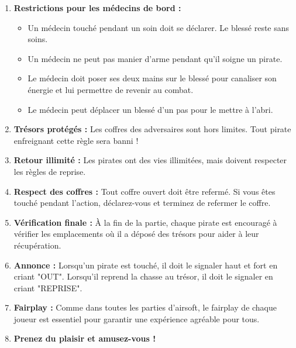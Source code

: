 \documentclass{pirategame}
\begin{document}
\begin{enumerate}[resume*=rules]
  \item \textbf{Restrictions pour les médecins de bord :}
    \begin{itemize}
      \item Un médecin touché pendant un soin doit se déclarer. Le blessé reste sans soins.
      \item Un médecin ne peut pas manier d'arme pendant qu'il soigne un pirate.
      \item Le médecin doit poser ses deux mains sur le blessé pour canaliser son énergie et lui permettre de revenir au combat.
      \item Le médecin peut déplacer un blessé d'un pas pour le mettre à l’abri.
    \end{itemize}
  \item \textbf{Trésors protégés :} Les coffres des adversaires sont hors limites. Tout pirate enfreignant cette règle sera banni !
  \item \textbf{Retour illimité :} Les pirates ont des vies illimitées, mais doivent respecter les règles de reprise.
  \item \textbf{Respect des coffres :} Tout coffre ouvert doit être refermé. Si vous êtes touché pendant l’action, déclarez-vous et terminez de refermer le coffre.
  \item \textbf{Vérification finale :} À la fin de la partie, chaque pirate est encouragé à vérifier les emplacements où il a déposé des trésors pour aider à leur récupération.
  \item \textbf{Annonce :} Lorsqu'un pirate est touché, il doit le signaler haut et fort en criant "OUT". Lorsqu'il reprend la chasse au trésor, il doit le signaler en criant "REPRISE".
  \item \textbf{Fairplay :} Comme dans toutes les parties d'airsoft, le fairplay de chaque joueur est essentiel pour garantir une expérience agréable pour tous.
  \item \textbf{Prenez du plaisir et amusez-vous !}
\end{enumerate}
\end{document}
